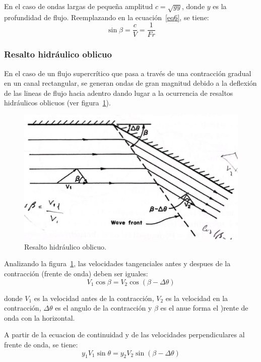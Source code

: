 \documentclass[11pt, oneside]{article}
\begin{document}
En el caso de ondas largas de pequeña amplitud $c = \sqrt{gy}$, donde $y$ es la profundidad de flujo. Reemplazando en la ecuaci\'on~\ref{eq6}, se tiene:
\begin{equation}
    \sin \beta =  \frac{c}{V} = \frac{1}{Fr}
    \label{eq6}
\end{equation}

\subsubsection{Resalto hidr\'aulico oblicuo}
En el caso de un flujo supercr\'itico que pasa a trav\'es de una contracci\'on gradual en un canal rectangular, se generan ondas de gran magnitud debido a la deflexi\'on de las lineas de flujo hacia adentro dando lugar a la ocurrencia de resaltos hidr\'aulicos oblicuos (ver figura~\ref{fig76}). 
\begin{figure}[h]
    \centering
    \includegraphics[width=0.8\linewidth]{fig76.jpeg}
    \caption{Resalto hidr\'aulico oblicuo.}
    \label{fig76}
\end{figure}

Analizando la figura~\ref{fig76}, las velocidades tangenciales antes y despues de la contracci\'on (frente de onda) deben ser iguales:
\begin{equation}
   V_1 \cos \beta = V_2 \cos \left(\beta - \Delta \theta \right)
    \label{eq6a}
\end{equation}

donde $V_1$ es la velocidad antes de la contracci\'on, $V_2$ es la velocidad en la contracci\'on, $\Delta \theta$ es el angulo de la contracci\'on y $\beta$ es el anue forma el )rente de onda con la horizontal. 

A partir de la ecuacion de continuidad y de las velocidades perpendiculares al frente de onda, se tiene:
\begin{equation}
   y_1 V_1 \sin \theta = y_2 V_2 \sin \left(\beta - \Delta \theta \right)
    \label{eq7}
\end{equation}
\end{document}
